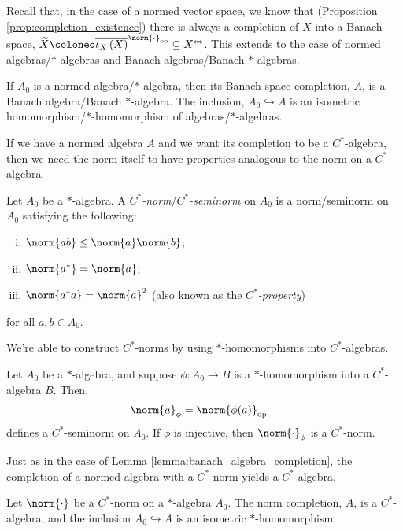 Recall that, in the case of a normed vector space, we know that (Proposition \ref{prop:completion_existence}) there is always a completion of $X$ into a Banach space, $\widetilde{X}\coloneq \overline{\iota_X\left( X \right)}^{\norm{\cdot}_{\op}}\subseteq X^{\ast\ast}$. This extends to the case of normed algebras/$\ast$-algebras and Banach algebras/Banach $\ast$-algebras.
\begin{lemma}\label{lemma:banach_algebra_completion}
  If $A_0$ is a normed algebra/$\ast$-algebra, then its Banach space completion, $A$, is a Banach algebra/Banach $\ast$-algebra. The inclusion, $A_0\hookrightarrow A$ is an isometric homomorphism/$\ast$-homomorphism of algebras/$\ast$-algebras.
\end{lemma}
If we have a normed algebra $A$ and we want its completion to be a $C^{\ast}$-algebra, then we need the norm itself to have properties analogous to the norm on a $C^{\ast}$-algebra.
\begin{definition}
  Let $A_0$ be a $\ast$-algebra. A \textit{$C^{\ast}$-norm}/\textit{$C^{\ast}$-seminorm} on $A_0$ is a norm/seminorm on $A_0$ satisfying the following:
  \begin{enumerate}[(i)]
    \item $\norm{ab}\leq \norm{a}\norm{b}$;
    \item $\norm{a^{\ast}} = \norm{a}$;
    \item $\norm{a^{\ast}a} = \norm{a}^2$ (also known as the \textit{$C^{\ast}$-property})
  \end{enumerate}
  for all $a,b\in A_0$.
\end{definition}
We're able to construct $C^{\ast}$-norms by using $\ast$-homomorphisms into $C^{\ast}$-algebras.
\begin{lemma}
  Let $A_0$ be a $\ast$-algebra, and suppose $\phi\colon A_0\rightarrow B$ is a $\ast$-homomorphism into a $C^{\ast}$-algebra $B$. Then,
  \begin{align*}
    \norm{a}_{\phi} &= \norm{\phi(a)}_{\op}
  \end{align*}
  defines a $C^{\ast}$-seminorm on $A_0$. If $\phi$ is injective, then $\norm{\cdot}_{\phi}$ is a $C^{\ast}$-norm.
\end{lemma}
Just as in the case of Lemma \ref{lemma:banach_algebra_completion}, the completion of a normed algebra with a $C^{\ast}$-norm yields a $C^{\ast}$-algebra.
\begin{lemma}
  Let $\norm{\cdot}$ be a $C^{\ast}$-norm on a $\ast$-algebra $A_0$. The norm completion, $A$, is a $C^{\ast}$-algebra, and the inclusion $A_0\hookrightarrow A$ is an isometric $\ast$-homomorphism.
\end{lemma}
